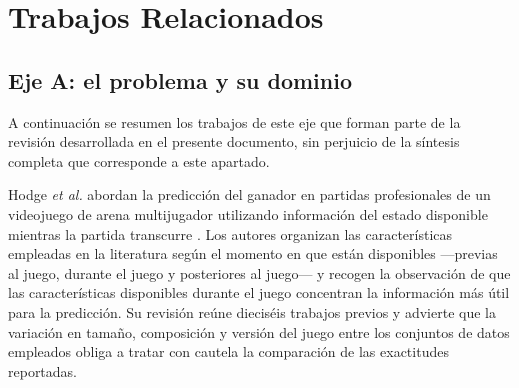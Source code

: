 %
%
\section{Trabajos Relacionados}
\label{sec:relacionados}



\subsection{Eje A: el problema y su dominio}
\label{subsec:ejea}


A continuación se resumen los trabajos de este eje que forman parte de la
revisión desarrollada en el presente documento, sin perjuicio de la
síntesis completa que corresponde a este apartado.

Hodge \textit{et al.} abordan la predicción del ganador en partidas
profesionales de un videojuego de arena multijugador utilizando información
del estado disponible mientras la partida transcurre
\cite{hodge_winprediction_2021}. Los autores organizan las características
empleadas en la literatura según el momento en que están disponibles
---previas al juego, durante el juego y posteriores al juego--- y recogen
la observación de que las características disponibles durante el juego
concentran la información más útil para la predicción. Su revisión reúne
dieciséis trabajos previos y advierte que la variación en tamaño,
composición y versión del juego entre los conjuntos de datos empleados
obliga a tratar con cautela la comparación de las exactitudes reportadas.

